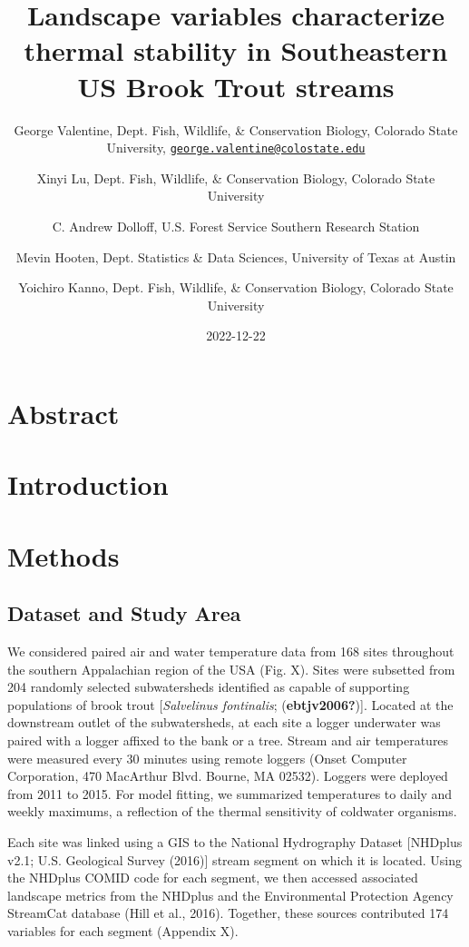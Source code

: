 \documentclass[
  11pt,
]{article}
\title{Landscape variables characterize thermal stability in Southeastern US Brook Trout streams}
\author{George Valentine, Dept. Fish, Wildlife, \& Conservation Biology, Colorado State University, \href{mailto:george.valentine@colostate.edu}{\nolinkurl{george.valentine@colostate.edu}} \and Xinyi Lu, Dept. Fish, Wildlife, \& Conservation Biology, Colorado State University \and C. Andrew Dolloff, U.S. Forest Service Southern Research Station \and Mevin Hooten, Dept. Statistics \& Data Sciences, University of Texas at Austin \and Yoichiro Kanno, Dept. Fish, Wildlife, \& Conservation Biology, Colorado State University}
\date{2022-12-22}
\begin{document}
\maketitle

{
\hypersetup{linkcolor=}
\setcounter{tocdepth}{2}
\tableofcontents
}
\newpage

\hypertarget{abstract}{%
\section{Abstract}\label{abstract}}

\newpage
{}

\hypertarget{introduction}{%
\section{Introduction}\label{introduction}}

\newpage

\hypertarget{methods}{%
\section{Methods}\label{methods}}

\hypertarget{dataset-and-study-area}{%
\subsection{Dataset and Study Area}\label{dataset-and-study-area}}

We considered paired air and water temperature data from 168 sites throughout the southern Appalachian region of the USA (Fig. X). Sites were subsetted from 204 randomly selected subwatersheds identified as capable of supporting populations of brook trout {[}\emph{Salvelinus fontinalis}; (\textbf{ebtjv2006?}){]}. Located at the downstream outlet of the subwatersheds, at each site a logger underwater was paired with a logger affixed to the bank or a tree. Stream and air temperatures were measured every 30 minutes using remote loggers (Onset Computer Corporation, 470 MacArthur Blvd. Bourne, MA 02532). Loggers were deployed from 2011 to 2015. For model fitting, we summarized temperatures to daily and weekly maximums, a reflection of the thermal sensitivity of coldwater organisms.

Each site was linked using a GIS to the National Hydrography Dataset {[}NHDplus v2.1; U.S. Geological Survey (2016){]} stream segment on which it is located. Using the NHDplus COMID code for each segment, we then accessed associated landscape metrics from the NHDplus and the Environmental Protection Agency StreamCat database (Hill et al., 2016). Together, these sources contributed 174 variables for each segment (Appendix X).
\end{document}
